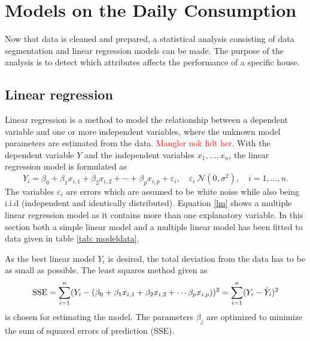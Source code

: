 \chapter{Models on the Daily Consumption}
Now that data is cleaned and prepared, a statistical analysis consisting of data segmentation and linear regression models can be made. The purpose of the analysis is to detect which attributes affects the performance of a specific house.

\section{Linear regression}
Linear regression is a method to model the relationship between a dependent variable and one or more independent variables, where the unknown model parameters are estimated from the data. \textcolor{red}{Mangler nok lidt her.} With the dependent variable $Y$ and the independent variables $x_1, \dots, x_n$, the linear regression model is formulated as
\begin{equation}
    Y_i = \beta_0 + \beta_1 x_{i,1} + \beta_2 x_{i,2} + \cdots + \beta_p x_{i,p} + \varepsilon_i, \quad \varepsilon_i ~ \mathcal{N}(0,\sigma^2), \quad i = 1,\dots, n. \label{lm}
\end{equation}
The variables $\varepsilon_i$ are errors which are assumed to be white noise while also being i.i.d (independent and identically distributed). Equation \eqref{lm} shows a multiple linear regression model as it contains more than one explanatory variable. In this section both a simple linear model and a multiple linear model has been fitted to data given in table \ref{tab: modeldata}.

\noindent As the best linear model $Y_i$ is desired, the total deviation from the data has to be as small as possible. The least squares method given as
\begin{equation}
    \text{SSE} = \sum_{i=1}^n (Y_i - (\beta_0 + \beta_1 x_{i,1} + \beta_2 x_{i,2} + \cdots  \beta_p x_{i,p}))^2 = \sum_{i=1}^n (Y_i - \Hat{Y}_i)^2
\end{equation}
is chosen for estimating the model. The parameters $\beta_j$ are optimized to minimize the sum of squared errors of prediction (SSE).

